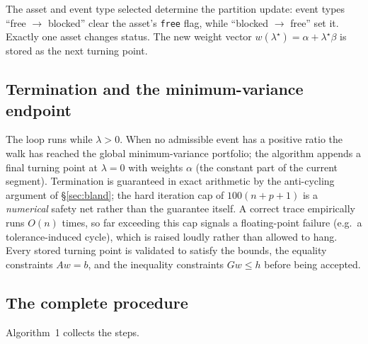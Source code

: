 \documentclass[11pt]{article}
\begin{document}
The asset and event type selected determine the partition update: event types
``free $\to$ blocked'' clear the asset's \texttt{free} flag, while ``blocked $\to$ free''
set it. Exactly one asset changes status. The new weight vector
$w(\lambda^{\star}) = \alpha + \lambda^{\star}\beta$ is stored as the next turning
point.

\subsection{Termination and the minimum-variance endpoint}

The loop runs while $\lambda > 0$. When no admissible event has a positive ratio the
walk has reached the global minimum-variance portfolio; the algorithm appends a final
turning point at $\lambda = 0$ with weights $\alpha$ (the constant part of the current
segment). Termination is guaranteed in exact arithmetic by the anti-cycling argument of
\S\ref{sec:bland}; the hard iteration cap of $100(n+p+1)$ is a \emph{numerical} safety net
rather than the guarantee itself. A correct trace empirically runs $O(n)$ times, so far
exceeding this cap signals a floating-point failure (e.g.\ a tolerance-induced cycle),
which is raised loudly rather than allowed to hang. Every stored turning point is
validated to satisfy the bounds, the equality constraints $A w = b$, and the
inequality constraints $G w \le h$ before being accepted.

\subsection{The complete procedure}

Algorithm~1 collects the steps.
\end{document}
